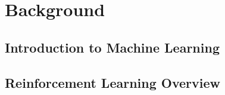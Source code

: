 \chapter{Background}

\section{Introduction to Machine Learning}

\section{Reinforcement Learning Overview}

